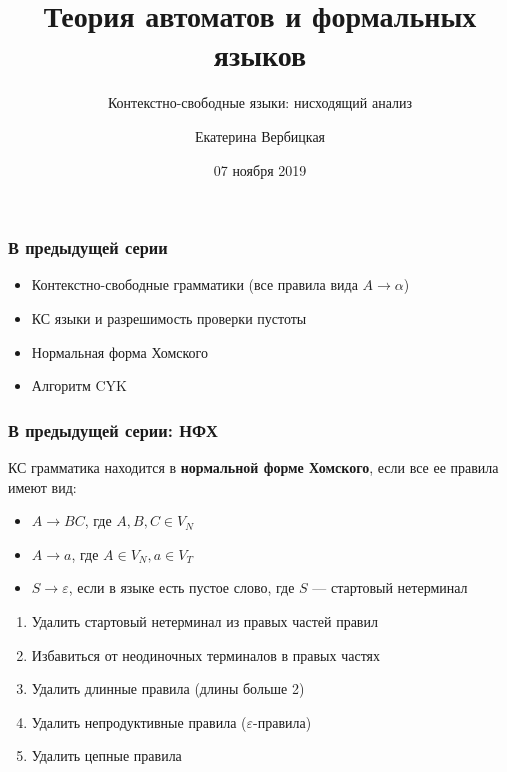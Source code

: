 \documentclass{beamer}
\title[]{Теория автоматов и формальных языков}
\subtitle[]{Контекстно-свободные языки: нисходящий анализ}
\institute[]{
Санкт-Петербургский государственный электротехнический университет <<ЛЭТИ>>\\
}
\author[]{Екатерина Вербицкая}
\date{07 ноября 2019}
\begin{document}
{
  \begin{frame}
    \titlepage
  \end{frame}
}


\begin{frame}[fragile]
  \transwipe[direction=90]
  \frametitle{В предыдущей серии}
  \begin{itemize}
    \item Контекстно-свободные грамматики (все правила вида $A \to \alpha$) 
    \item КС языки и разрешимость проверки пустоты
    \item Нормальная форма Хомского
    \item Алгоритм CYK
  \end{itemize}
\end{frame}

\begin{frame}[fragile]
  \transwipe[direction=90]
  \frametitle{В предыдущей серии: НФХ}
  КС грамматика находится в \textbf{нормальной форме Хомского}, если все ее правила имеют вид: 
  \begin{itemize}
    \item $A \to B C$, где $A,B,C \in V_N$
    \item $A \to a$, где $A \in V_N, a \in V_T$
    \item $S \to \varepsilon$, если в языке есть пустое слово, где $S$ --- стартовый нетерминал
  \end{itemize}

  \begin{enumerate}
    \item Удалить стартовый нетерминал из правых частей правил 
    \item Избавиться от неодиночных терминалов в правых частях 
    \item Удалить длинные правила (длины больше 2)
    \item Удалить непродуктивные правила ($\varepsilon$-правила)
    \item Удалить цепные правила
   \end{enumerate}
\end{frame}
\end{document}
